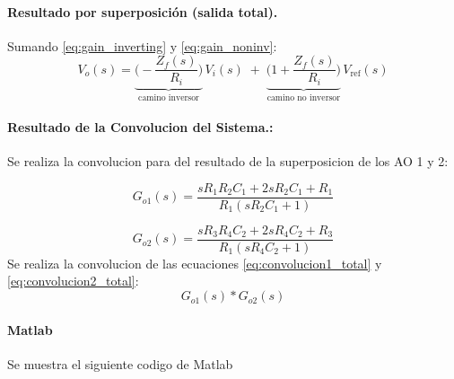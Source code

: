 \paragraph{Resultado por superposición (salida total).}
Sumando \eqref{eq:gain_inverting} y \eqref{eq:gain_noninv}:
\begin{equation}
	V_o(s)
	= \underbrace{\Bigg(-\frac{Z_f(s)}{R_i}\Bigg)}_{\text{camino inversor}}\,V_i(s)
	\;+\;
	\underbrace{\Bigg(1+\frac{Z_f(s)}{R_i}\Bigg)}_{\text{camino no inversor}}\,V_{\text{ref}}(s)
	\label{eq:superpos_total}
\end{equation}

\paragraph{Resultado de la Convolucion del Sistema.:}
Se realiza la convolucion para del resultado de la superposicion de los AO 1 y 2: 

\begin{equation}
	G_{o1}(s) = \frac{sR_1R_2C_1+2sR_2C_1+R_1}{R_1(sR_2C_1+1)}
	\label{eq:convolucion1_total}
\end{equation}

\begin{equation}
	G_{o2}(s) = \frac{sR_3R_4C_2+2sR_4C_2+R_3}{R_1(sR_4C_2+1)}
	\label{eq:convolucion2_total}
\end{equation}
Se realiza la convolucion de las ecuaciones \eqref{eq:convolucion1_total} y \eqref{eq:convolucion2_total}:
\begin{equation}
	G_{o1}(s)*G_{o2}(s) 
	\label{eq:convolucion_total}
\end{equation}

\onecolumn
\paragraph{Matlab} Se muestra el siguiente codigo de Matlab

